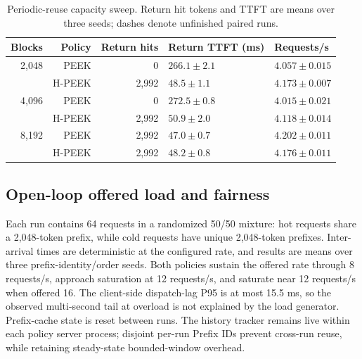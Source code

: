 \documentclass[10pt,twocolumn]{article}
\begin{document}
\begin{table}[t]
  \centering
  \caption{Periodic-reuse capacity sweep. Return hit tokens and TTFT are means
  over three seeds; dashes denote unfinished paired runs.}
  \label{tab:capacity-progress}
  \begin{tabular}{rrrll}
    \toprule
    Blocks & Policy & Return hits & Return TTFT (ms) & Requests/s \\
    \midrule
    2,048 & PEEK & 0 & $266.1\pm2.1$ & $4.057\pm0.015$ \\
          & H-PEEK & 2,992 & $48.5\pm1.1$ & $4.173\pm0.007$ \\
    4,096 & PEEK & 0 & $272.5\pm0.8$ & $4.015\pm0.021$ \\
          & H-PEEK & 2,992 & $50.9\pm2.0$ & $4.118\pm0.014$ \\
    8,192 & PEEK & 2,992 & $47.0\pm0.7$ & $4.202\pm0.011$ \\
          & H-PEEK & 2,992 & $48.2\pm0.8$ & $4.176\pm0.011$ \\
    \bottomrule
  \end{tabular}
\end{table}

\subsection{Open-loop offered load and fairness}

Each run contains
64 requests in a randomized 50/50 mixture: hot requests share a 2,048-token
prefix, while cold requests have unique 2,048-token prefixes. Inter-arrival
times are deterministic at the configured rate, and results are means over
three prefix-identity/order seeds. Both policies sustain the offered rate
through 8 requests/s, approach saturation at 12 requests/s, and saturate near
12 requests/s when offered 16. The client-side dispatch-lag P95 is at most
15.5 ms, so the observed multi-second tail at overload is not explained by the
load generator. Prefix-cache state is reset between runs. The history tracker
remains live within each policy server process; disjoint per-run Prefix IDs
prevent cross-run reuse, while retaining steady-state bounded-window overhead.
\end{document}
